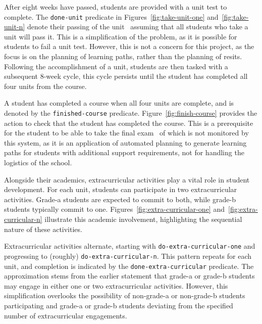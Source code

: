 After eight weeks have passed, students are provided with a unit test to complete. The \texttt{done-unit} predicate in Figures~\ref{fig:take-unit-one} and~\ref{fig:take-unit-n} denote their passing of the unit \textemdash~assuming that all students who take a unit will pass it. This is a simplification of the problem, as it is possible for students to fail a unit test. However, this is not a concern for this project, as the focus is on the planning of learning paths, rather than the planning of resits. Following the accomplishment of a unit, students are then tasked with a subsequent 8-week cycle, this cycle persists until the student has completed all four units from the course.




A student has completed a course when all four units are complete, and is denoted by the \texttt{finished-course} predicate. Figure~\ref{fig:finish-course} provides the action to check that the student has completed the course. This is a prerequisite for the student to be able to take the final exam \textemdash~of which is not monitored by this system, as it is an application of automated planning to generate learning paths for students with additional support requirements, not for handling the logistics of the school.

Alongside their academics, extracurricular activities play a vital role in student development. For each unit, students can participate in two extracurricular activities. Grade-a students are expected to commit to both, while grade-b students typically commit to one. Figures~\ref{fig:extra-curricular-one} and~\ref{fig:extra-curricular-n} illustrate this academic involvement, highlighting the sequential nature of these activities.




Extracurricular activities alternate, starting with \texttt{do-extra-curricular-one} and progressing to (roughly) \texttt{do-extra-curricular-n}. This pattern repeats for each unit, and completion is indicated by the \texttt{done-extra-curricular} predicate. The approximation stems from the earlier statement that grade-a or grade-b students may engage in either one or two extracurricular activities. However, this simplification overlooks the possibility of non-grade-a or non-grade-b students participating and grade-a or grade-b students deviating from the specified number of extracurricular engagements.

